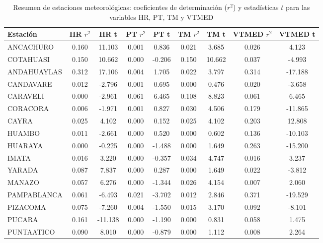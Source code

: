 \begin{landscape}
\begin{table}[ht]
\centering
\caption{Resumen de estaciones meteorológicas: coeficientes de determinación ($r^2$) y estadísticas $t$ para las variables HR, PT, TM y VTMED}
\begin{adjustbox}{valign=c, width=\textwidth}
\begin{tabular}{lcccccccc}
\toprule
\textbf{Estación} & \textbf{HR $r^2$} & \textbf{HR t} & \textbf{PT $r^2$} & \textbf{PT t} & \textbf{TM $r^2$} & \textbf{TM t} & \textbf{VTMED $r^2$} & \textbf{VTMED t} \\
\midrule
ANCACHURO     & 0.160 & 11.103 & 0.001 &  0.836 & 0.021 &  3.685 & 0.026 &  4.123 \\
COTAHUASI     & 0.150 & 10.662 & 0.000 & -0.206 & 0.150 & 10.662 & 0.037 & -4.993 \\
ANDAHUAYLAS   & 0.312 & 17.106 & 0.004 &  1.705 & 0.022 &  3.797 & 0.314 & -17.188 \\
CANDAVARE     & 0.012 & -2.796 & 0.001 &  0.695 & 0.000 &  0.476 & 0.020 & -3.658 \\
CARAVELI      & 0.000 & -2.961 & 0.061 &  6.465 & 0.108 &  8.823 & 0.061 &  6.465 \\
CORACORA      & 0.006 & -1.971 & 0.001 &  0.827 & 0.030 &  4.506 & 0.179 & -11.865 \\
CAYRA         & 0.025 &  4.102 & 0.000 &  0.152 & 0.025 &  4.102 & 0.203 & 12.808 \\
HUAMBO        & 0.011 & -2.661 & 0.000 &  0.520 & 0.000 &  0.602 & 0.136 & -10.103 \\
HUARAYA       & 0.000 & -0.225 & 0.000 & -1.488 & 0.000 &  1.649 & 0.263 & -15.200 \\
IMATA         & 0.016 &  3.220 & 0.000 & -0.357 & 0.034 &  4.747 & 0.016 &  3.237 \\
YARADA        & 0.087 &  7.837 & 0.000 &  0.287 & 0.000 &  1.649 & 0.022 & -3.812 \\
MANAZO        & 0.057 &  6.276 & 0.000 & -1.344 & 0.026 &  4.154 & 0.007 &  2.060 \\
PAMPABLANCA   & 0.061 & -6.493 & 0.021 & -3.702 & 0.012 &  2.846 & 0.371 & -19.529 \\
PIZACOMA      & 0.075 & -7.260 & 0.004 & -1.550 & 0.015 &  3.170 & 0.092 & -8.101 \\
PUCARA        & 0.161 & -11.138& 0.000 & -1.190 & 0.000 &  0.831 & 0.058 &  1.475 \\
PUNTAATICO    & 0.090 &  8.010 & 0.000 & -0.879 & 0.000 &  1.112 & 0.008 &  2.264 \\

\end{tabular}
\end{adjustbox}
\end{table}
\end{landscape}
